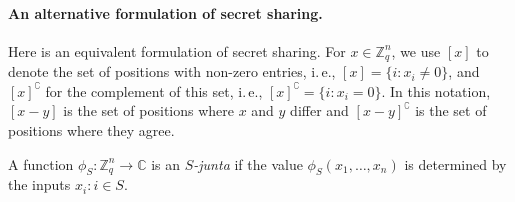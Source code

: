 \documentclass[11pt]{article}
\numberwithin{equation}{section}
\theoremstyle{definition}
\theoremstyle{plain}
\newcommand{\Z}{\mathbb Z}
\newcommand{\ie}{i.\,e.}
\providecommand\compl[1]{#1^{\complement}}
\begin{document}
\paragraph{An alternative formulation of secret sharing.}
Here is an equivalent formulation of secret sharing.  For $x \in \Z_q^n$,
we use $[x]$ to denote the set of positions with non-zero entries,
\ie, $[x] = \{i\colon x_i \neq 0\}$, and $\compl{[x]}$ for
the complement of this set, \ie, $\compl{[x]}=\{i\colon x_i = 0\}$.  
In this notation, $[x - y]$ is the set of positions
where  $x$ and $y$ differ and $\compl{[x - y]}$ is the set of positions
where they agree.

A function $\phi_S \colon \Z_q^n \to \mathbb{C}$ is an \emph{$S$-junta} if the value $\phi_S(x_1, \dots, x_n)$ is determined by the inputs $x_i\colon i \in S$.
\end{document}
